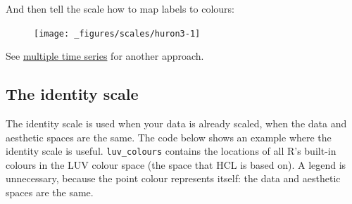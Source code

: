 And then tell the scale how to map labels to colours:

\begin{Shaded}
\begin{Highlighting}[]
\StringTok{  }\NormalTok{(}\NormalTok{(} \StringTok{ }\NormalTok{, } \NormalTok{)) +}\StringTok{ }
\StringTok{  }\NormalTok{(}\NormalTok{(} \StringTok{ }\NormalTok{, } \NormalTok{)) +}\StringTok{ }
\StringTok{  }\NormalTok{(}\NormalTok{, }
     \NormalTok{(} \NormalTok{=}\NormalTok{, } \NormalTok{=}\NormalTok{)}
  \NormalTok{)}
\end{Highlighting}
\end{Shaded}

\begin{figure}[H]
  \centering
  \texttt{[image: \_figures/scales/huron3-1]}
\end{figure}

See \protect\hyperlink{sec:spread-gather}{multiple time series} for
another approach.

\subsection{The identity scale}\label{sub:scale-identity}

The identity scale is used when your data is already scaled, when the
data and aesthetic spaces are the same. The code below shows an example
where the identity scale is useful. \texttt{luv\_colours} contains the
locations of all R's built-in colours in the LUV colour space (the space
that HCL is based on). A legend is unnecessary, because the point colour
represents itself: the data and aesthetic spaces are the same.
 

